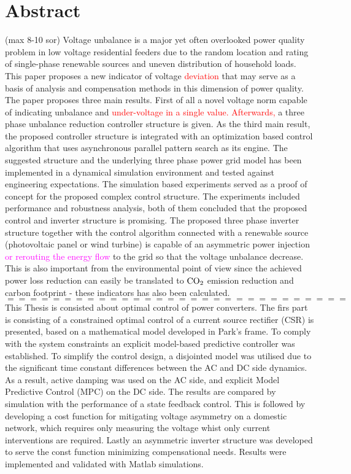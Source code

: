 \chapter*{Abstract}

\thispagestyle{plain}
 (max 8-10 sor)
     Voltage unbalance is a major yet often overlooked power quality problem in low voltage residential feeders due to the random location and rating of single-phase renewable sources and uneven distribution of household loads. This paper proposes a new indicator of voltage \textcolor{red}{deviation} that may serve as a basis of analysis and compensation methods in this dimension of power quality. The paper proposes three main results. First of all a novel voltage norm capable of indicating unbalance and \textcolor{red}{under-voltage in a single value. Afterwards,} a three phase unbalance reduction controller structure is given. As the third main result, the proposed controller structure is integrated with an optimization based control algorithm that uses asynchronous parallel pattern search as its engine. The suggested structure and the underlying three phase power grid model has been implemented in a dynamical simulation environment and tested against engineering expectations.
    The simulation based experiments served as a proof of concept for the proposed complex control structure. The experiments included performance and robustness analysis, both of them concluded that the proposed control and inverter structure is promising.
    The proposed three phase inverter structure together with the control algorithm connected with a renewable source (photovoltaic panel or wind turbine) is capable of an asymmetric power injection \textcolor{magenta}{or rerouting the energy flow} to the grid so that the voltage unbalance decrease. This is also important from the environmental point of view since the achieved power loss reduction can easily be translated to $\textnormal{CO}_2$ emission reduction and carbon footprint - these indicators has also been calculated.\\%
     $==============================$
    This Thesis is consisted about optimal control of power converters. The firs part is consisting of a constrained optimal control of a current source rectifier (CSR) is presented, based on a mathematical model developed in Park's frame. To comply with the system constraints an explicit model-based predictive controller was established. To simplify the control design, a disjointed model was utilised due to the significant time constant differences between the AC and DC side dynamics. As a result, active damping was used on the AC side, and explicit Model Predictive Control (MPC) on the DC side. The results are compared by simulation with the performance of a state feedback control. This is followed by developing a cost function for mitigating voltage asymmetry on a domestic network, which requires only measuring the voltage whist only current interventions are required. Lastly an asymmetric inverter structure was developed to serve the const function minimizing compensational needs. Results were implemented and validated with Matlab simulations.\\

%


